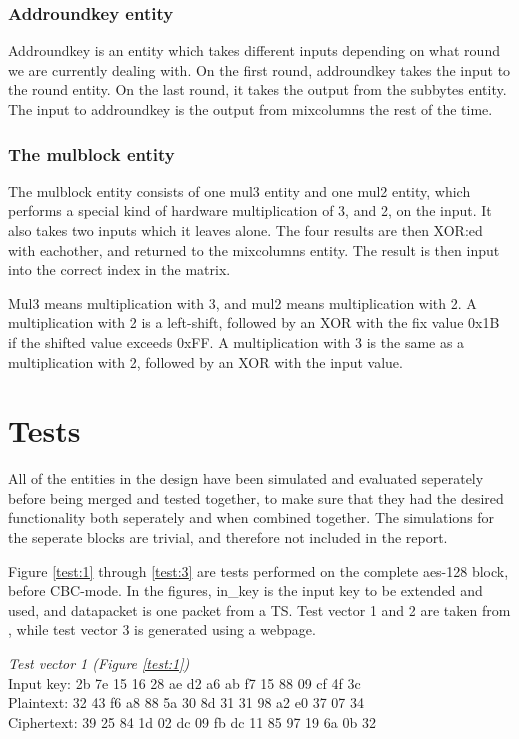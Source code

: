 \subsubsection{Addroundkey entity}
Addroundkey is an entity which takes different inputs depending on 
what round we are currently dealing with. On the first round, addroundkey takes 
the input to the round entity. On the last round, it takes the output from the 
subbytes entity. The input to addroundkey is the output from mixcolumns the rest 
of the time.

\subsubsection{The mulblock entity}
The mulblock entity consists of one mul3 entity and one mul2 entity, which 
performs a special kind of hardware multiplication of 3, and 2, on the input. It 
also takes two inputs which it leaves alone. The four results are then XOR:ed 
with eachother, and returned to the mixcolumns entity. The result is then input 
into the correct index in the matrix. 

Mul3 means multiplication with 3, and mul2 means multiplication with 2. A 
multiplication with 2 is a left-shift, followed by an XOR with the fix value 0x1B
if the shifted value exceeds 0xFF. A multiplication with 3 is the same as a 
multiplication with 2, followed by an XOR with the input value.

\section{Tests}
All of the entities in the design have been simulated and evaluated seperately 
before being merged and tested together, to make sure that they had the desired 
functionality both seperately and when combined together. The simulations for the
seperate blocks are trivial, and therefore not included in the report.

Figure \ref{test:1} through \ref{test:3} are tests performed on the complete 
aes-128 block, before CBC-mode. In the figures, in\_key is the input key to be 
extended and used, and datapacket is one packet from a TS. Test vector 1 and 2 
are taken from \citep{AES:2001}, while test vector 3 is generated using a 
webpage.

\emph{Test vector 1 (Figure \ref{test:1})}\\
Input key: 2b 7e 15 16 28 ae d2 a6 ab f7 15 88 09 cf 4f 3c\\
Plaintext: 32 43 f6 a8 88 5a 30 8d 31 31 98 a2 e0 37 07 34\\
Ciphertext: 39 25 84 1d 02 dc 09 fb dc 11 85 97 19 6a 0b 32

